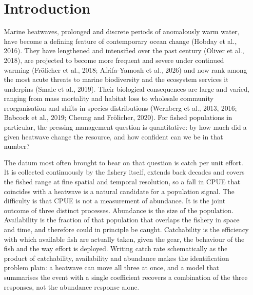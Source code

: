 \documentclass[
  11pt,
  a4paper,
]{article}
\begin{document}
\begin{abstract}
\textbf{Keywords:} marine heatwave; catch per unit effort; catchability;
availability; hyperstability; identifiability; operating model; species
distribution; simulation; survey design
\end{abstract}


\hypertarget{introduction}{%
\section{Introduction}\label{introduction}}

Marine heatwaves, prolonged and discrete periods of anomalously warm
water, have become a defining feature of contemporary ocean change
(Hobday et al., 2016). They have lengthened and intensified over the
past century (Oliver et al., 2018), are projected to become more
frequent and severe under continued warming (Frölicher et al., 2018;
Afrifa-Yamoah et al., 2026) and now rank among the most acute threats to
marine biodiversity and the ecosystem services it underpins (Smale et
al., 2019). Their biological consequences are large and varied, ranging
from mass mortality and habitat loss to wholesale community
reorganisation and shifts in species distributions (Wernberg et al.,
2013, 2016; Babcock et al., 2019; Cheung and Frölicher, 2020). For
fished populations in particular, the pressing management question is
quantitative: by how much did a given heatwave change the resource, and
how confident can we be in that number?

The datum most often brought to bear on that question is catch per unit
effort. It is collected continuously by the fishery itself, extends back
decades and covers the fished range at fine spatial and temporal
resolution, so a fall in CPUE that coincides with a heatwave is a
natural candidate for a population signal. The difficulty is that CPUE
is not a measurement of abundance. It is the joint outcome of three
distinct processes. Abundance is the size of the population.
Availability is the fraction of that population that overlaps the
fishery in space and time, and therefore could in principle be caught.
Catchability is the efficiency with which available fish are actually
taken, given the gear, the behaviour of the fish and the way effort is
deployed. Writing catch rate schematically as the product of
catchability, availability and abundance makes the identification
problem plain: a heatwave can move all three at once, and a model that
summarises the event with a single coefficient recovers a combination of
the three responses, not the abundance response alone.
\end{document}
